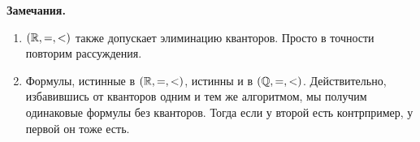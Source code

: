 \textbf{Замечания.} 
\begin{enumerate}
    \item $(\mathbb{R}, =, <)$ также допускает элиминацию кванторов. Просто в точности повторим рассуждения.
    \item Формулы, истинные в $(\mathbb{R}, =, <)$, истинны и в $(\mathbb{Q}, =, <)$. Действительно, избавившись от кванторов одним и тем же алгоритмом, мы получим одинаковые формулы без кванторов. Тогда если у второй есть контрпример, у первой он тоже есть.
\end{enumerate}

